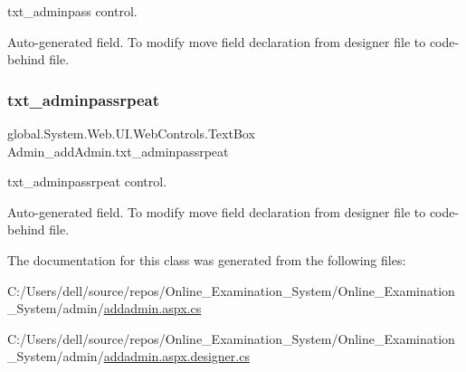 txt\+\_\+adminpass control. 

Auto-\/generated field. To modify move field declaration from designer file to code-\/behind file. \mbox{\label{class_admin__add_admin_a9fa301b44ec7de5fa293d1ae4bfce10b}} 
\subsubsection{\texorpdfstring{txt\_adminpassrpeat}{txt\_adminpassrpeat}}
{\footnotesize\ttfamily global.\+System.\+Web.\+U\+I.\+Web\+Controls.\+Text\+Box Admin\+\_\+add\+Admin.\+txt\+\_\+adminpassrpeat\hspace{0.3cm}{\ttfamily [protected]}}



txt\+\_\+adminpassrpeat control. 

Auto-\/generated field. To modify move field declaration from designer file to code-\/behind file. 

The documentation for this class was generated from the following files\+:\begin{DoxyCompactItemize}
\item 
C\+:/\+Users/dell/source/repos/\+Online\+\_\+\+Examination\+\_\+\+System/\+Online\+\_\+\+Examination\+\_\+\+System/admin/\mbox{\hyperlink{addadmin_8aspx_8cs}{addadmin.\+aspx.\+cs}}\item 
C\+:/\+Users/dell/source/repos/\+Online\+\_\+\+Examination\+\_\+\+System/\+Online\+\_\+\+Examination\+\_\+\+System/admin/\mbox{\hyperlink{addadmin_8aspx_8designer_8cs}{addadmin.\+aspx.\+designer.\+cs}}\end{DoxyCompactItemize}
